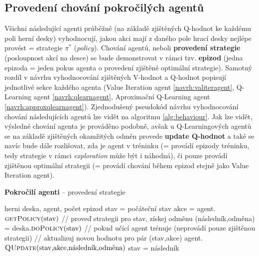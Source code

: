 \subsection*{Provedení chování pokročilých agentů}
Všichni následující agenti průběžně (na základě zjištěných Q-hodnot ke každému poli herní desky) vyhodnocují, jakou akci mají z daného pole hrací desky nejlépe provést = strategie $\pi^*$ (\textit{policy}). Chování agentů, neboli \textbf{provedení strategie} (posloupnost akcí na desce) se bude demonstrovat v rámci tzv. \textbf{epizod} (jedna epizoda = jeden pokus agenta o provedení zjištěné optimální strategie). Samotný rozdíl v návrhu vyhodnocování zjištěných {V-hodnot} a Q-hodnot popisují jednotlivé sekce každého agenta (Value Iteration agent \ref{navrh:valiteragent}, Q-Learning agent \ref{navrh:qlearnagent}, Aproximační Q-Learning agent \ref{navrh:approxqlearnagent}). Zjednodušený pseudokód návrhu vyhodnocování chování následujících agentů lze vidět na algoritmu \ref{alg:behaviour}. Jak lze vidět, výsledné chování agenta je prováděno podobně, avšak u Q-Learningových agentů se na základě zjištěných okamžitých odměn provede \textbf{update Q-hodnot} a také se navíc bude dále rozlišovat, zda je agent v tréninku (= provádí epizody tréninku, tedy strategie v rámci \textit{exploration} může být i náhodná), či pouze provádí zjištěnou optimální strategii (= provádí chování během epizod stejně jako Value Iteration agent).

\begin{algorithm}
\caption{\textbf{Pokročilí agenti} -- provedení strategie}
\label{alg:behaviour}
\begin{algorithmic}[1]

\Require herni deska, agent, počet epizod
    stav = počáteční stav
      \State akce = agent.$\text{\Call{getPolicy}{stav}}$ 
      \State // proveď strategii pro stav, získej odměnu
      \State (následník,odměna) = deska.$\text{\Call{doPolicy}{stav}}$
      \State // pokud učící agent trénuje (neprovádí pouze zjištěnou strategii)
          \State // aktualizuj novou hodnotu pro pár (stav,akce)
          \State agent.$\text{\Call{QUpdate}{stav,akce,následník,odměna}}$
        \EndIf
      \EndIf
      \State stav = následník
    \EndWhile
  \EndFor
\EndProcedure

\end{algorithmic}
\end{algorithm}

